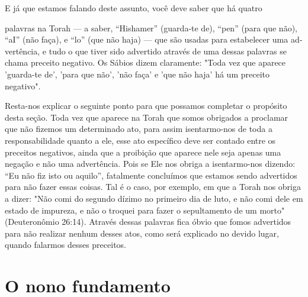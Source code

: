 E já que estamos falando deste assunto, você deve saber que há quatro

palavras na Torah --- a saber, ``Hishamer'' (guarda-te de), ``pen'' (para
que não), ``aI'' (não faça), e ``lo'' (que não haja) --- que são usadas para
estabelecer uma ad­vertência, e tudo o que tiver sido advertido através
de uma dessas palavras se cha­ma preceito negativo. Os Sábios dizem
claramente: "Toda vez que aparece 'guar­da-te de', 'para que não', 'não
faça' e 'que não haja' há um preceito negativo".

Resta-nos explicar o seguinte ponto para que possamos completar o
propósito desta seção. Toda vez que aparece na Torah que somos obrigados
a proclamar que não fizemos um determinado ato, para assim isentarmo-nos
de toda a responsabilidade quanto a ele, esse ato específico deve ser
contado entre os preceitos negativos, ainda que a proibição que aparece
nele seja ape­nas uma negação e não uma advertência. Pois se Ele nos
obriga a isentarmo-nos dizendo: ``Eu não fiz isto ou aquilo'', fatalmente
concluímos que estamos sen­do advertidos para não fazer essas coisas.
Tal é o caso, por exemplo, em que a Torah nos obriga a dizer: "Não comi
do segundo dízimo no primeiro dia de luto, e não comi dele em estado de
impureza, e não o troquei para fazer o se­pultamento de um morto"
(Deuteronômio 26:14). Através dessas palavras fica óbvio que fomos
advertidos para não realizar nenhum desses atos, como será explicado no
devido lugar, quando falarmos desses preceitos.

\chapter*{O nono fundamento}


